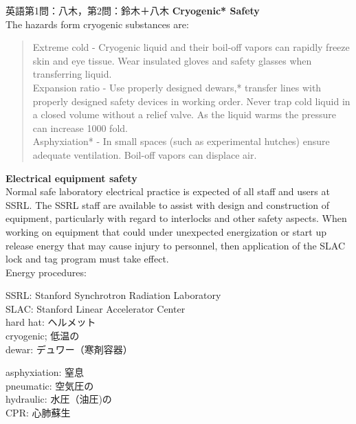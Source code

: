 \documentclass[fleqn]{jbook}
\begin{document}
\begin{question}{英語}{第1問：八木，第2問：鈴木＋八木}
{\bf Cryogenic* Safety}\\
The hazards form cryogenic substances are:
\begin{quote}
Extreme cold \-- Cryogenic liquid and their boil-off vapors can rapidly freeze 
skin and eye tissue. Wear insulated gloves and safety glasses when 
transferring liquid.\\
Expansion ratio \-- Use properly designed dewars,* transfer lines with 
properly designed safety devices in working order. Never trap cold liquid in a 
closed volume without a relief valve. As the liquid warms the pressure can 
increase 1000 fold.\\
Asphyxiation* \-- In small spaces (such as experimental hutches) ensure 
adequate ventilation. Boil-off vapors can displace air.
\end{quote}

{\bf Electrical equipment safety}\\
Normal safe laboratory electrical practice is expected of all staff and users 
at SSRL. The SSRL staff are available to assist with design and construction 
of equipment, particularly with regard to interlocks and other safety aspects. 
When working on equipment that could under unexpected energization or start up 
release energy that may cause injury to personnel, then application of the 
SLAC lock and tag program must take effect. \\

Energy procedures:\\



\vspace{2mm}
\begin{minipage}{8.0cm}
SSRL: Stanford Synchrotron Radiation Laboratory\\
SLAC: Stanford Linear Accelerator Center\\
hard hat: ヘルメット\\
cryogenic; 低温の\\
dewar: デュワー（寒剤容器）\\
\end{minipage}
\begin{minipage}{7.2cm}
asphyxiation: 窒息\\
pneumatic: 空気圧の\\
hydraulic: 水圧（油圧)の\\
CPR: 心肺蘇生\\
\end{minipage}


\end{question}
\end{document}
